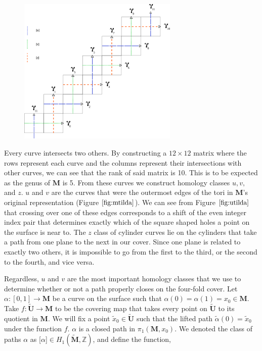\documentclass[]{article}
\begin{document}
\begin{figure}[H]
\includegraphics[width=3in]{homologyclass.png}
\centering
\end{figure}
Every curve intersects two others. By constructing a $12\times12$ matrix where the rows represent each curve and the columns represent their intersections with other curves, we can see that the rank of said matrix is 10. This is to be expected as the genus of $\mathbf M$ is 5. From these curves we construct homology classes $u,v,$ and $z$. $u$ and $v$ are the curves that were the outermost edges of the tori in $\mathbf{M}$'s original representation (Figure $\ref{fig:mtilda}$). We can see from Figure $\ref{fig:utilda}$ that crossing over one of these edges corresponds to a shift of the even integer index pair that determines exactly which of the square shaped holes a point on the surface is near to. The $z$ class of cylinder curves lie on the cylinders that take a path from one plane to the next in our cover. Since one plane is related to exactly two others, it is impossible to go from the first to the third, or the second to the fourth, and vice versa. 

Regardless, $u$ and $v$ are the most important homology classes that we use to determine whether or not a path properly closes on the four-fold cover. Let $\alpha:[0,1]\rightarrow\mathbf M$ be a curve on the surface such that $\alpha(0)=\alpha(1)=x_0\in\mathbf{M}$. Take $f:\tilde{\mathbf U}\rightarrow\mathbf M$ to be the covering map that takes every point on $\tilde{\mathbf U}$ to its quotient in $\mathbf{M}$. We will fix a point $\tilde{x}_0\in\tilde{\mathbf U}$ such that the lifted path $\tilde\alpha(0)=\tilde{x}_0$ under the function $f$. $\alpha$ is a closed path in $\pi_1(\mathbf M,x_0)$. We denoted the class of paths $\alpha$ as [$\alpha$]$\in H_1(\tilde{\mathbf{M}},\mathbb Z)$, and define the function,
\end{document}
